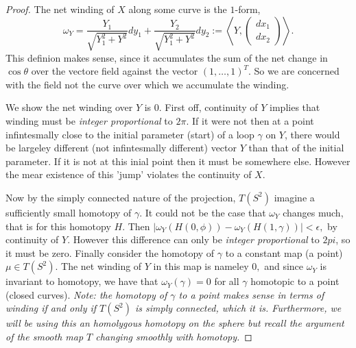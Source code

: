 \documentclass[letter]{article}
\newenvironment{menumerate}{%
  \edef\backupindent{\the\parindent}%
  \enumerate%
  \setlength{\parindent}{\backupindent}%
}{\endenumerate}
\begin{document}
\begin{menumerate}
\begin{menumerate}
\begin{proof}
			 The net winding of $X$ along some curve is the $1$-form, 
			 \begin{equation}
			 	\omega_Y = \frac{Y_1}{\sqrt{Y_1^2 + Y^2}}dy_1 + \frac{Y_2}{\sqrt{Y_1^2 + Y^2}} dy_2 := \left\langle Y, \begin{pmatrix}
			 		dx_1 \\
			 		dx_2
			 	\end{pmatrix} \right\rangle.
			 \end{equation}
			 This definion makes sense, since it accumulates the sum of the net change in $\cos\theta$ over the vectore field 
			 against the vector $(1,\dots,1)^T.$ So we are concerned with the field not the curve over which we accumulate the winding.

			 We show the net winding over $Y$ is $0$. First off, continuity of $Y$ implies that winding must be \emph{integer proportional} to $2\pi$.
			 If it were not then at a point infintesmally close to the initial parameter (start) of a loop $\gamma$ on $Y$, there would be 
			 largeley different (not infintesmally different) vector $Y$ than that of the initial parameter. If it is not at this inial point
			 then it must be somewhere else. However the mear existence of this 'jump' violates the continuity of $X.$ 

			 Now by the simply connected
			 nature of the projection, $T(S^2)$ imagine a sufficiently small homotopy of $\gamma$. It could not be the case that $\omega_Y$ changes
			 much, that is for this homotopy $H.$ Then $|\omega_Y(H(0,\phi)) - \omega_Y(H(1,\gamma))| < \epsilon,$ by continuity of $Y.$  However
			 this difference can only be \emph{integer proportional} to $2pi$, so it must be zero. Finally consider the homotopy of $\gamma$ to
			 a constant map (a point) $\mu \in T(S^2).$ The net winding of $Y$ in this map is nameley $0,$ and since $\omega_Y$ is invariant
			 to homotopy, we have that $\omega_Y(\gamma) = 0 $ for all $ \gamma$ homotopic to a point (closed curves). \emph{Note: the homotopy
			 of $\gamma$ to a point makes sense in terms of winding if and only if $T(S^2)$ is simply connected, which it is. Furthermore, 
			 we will be using this an homolygous homotopy on the sphere but recall the argument of the smooth map $T$ changing smoothly with homotopy.}


\end{proof}
\end{menumerate}
\end{menumerate}
\end{document}
